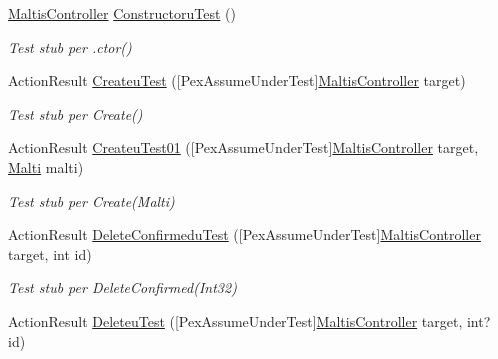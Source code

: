 \begin{DoxyCompactItemize}
\item 
\mbox{\hyperlink{class_brew_day2_1_1_controllers_1_1_maltis_controller}{Maltis\+Controller}} \mbox{\hyperlink{class_brew_day2_1_1_controllers_1_1_unit_test_1_1_maltis_controlleru_test_a98772566bedd26419c0c8193c993d287}{Constructoru\+Test}} ()
\begin{DoxyCompactList}\small\item\em Test stub per .ctor()\end{DoxyCompactList}\item 
Action\+Result \mbox{\hyperlink{class_brew_day2_1_1_controllers_1_1_unit_test_1_1_maltis_controlleru_test_a58c111dceecc7497fb50b430b64a08f0}{Createu\+Test}} (\mbox{[}Pex\+Assume\+Under\+Test\mbox{]}\mbox{\hyperlink{class_brew_day2_1_1_controllers_1_1_maltis_controller}{Maltis\+Controller}} target)
\begin{DoxyCompactList}\small\item\em Test stub per Create()\end{DoxyCompactList}\item 
Action\+Result \mbox{\hyperlink{class_brew_day2_1_1_controllers_1_1_unit_test_1_1_maltis_controlleru_test_a229ca42a99c42c426cfd3e201e561356}{Createu\+Test01}} (\mbox{[}Pex\+Assume\+Under\+Test\mbox{]}\mbox{\hyperlink{class_brew_day2_1_1_controllers_1_1_maltis_controller}{Maltis\+Controller}} target, \mbox{\hyperlink{class_brew_day2_1_1_models_1_1_malti}{Malti}} malti)
\begin{DoxyCompactList}\small\item\em Test stub per Create(\+Malti)\end{DoxyCompactList}\item 
Action\+Result \mbox{\hyperlink{class_brew_day2_1_1_controllers_1_1_unit_test_1_1_maltis_controlleru_test_af37fbef2d7458e4d9208dc33d5468a07}{Delete\+Confirmedu\+Test}} (\mbox{[}Pex\+Assume\+Under\+Test\mbox{]}\mbox{\hyperlink{class_brew_day2_1_1_controllers_1_1_maltis_controller}{Maltis\+Controller}} target, int id)
\begin{DoxyCompactList}\small\item\em Test stub per Delete\+Confirmed(\+Int32)\end{DoxyCompactList}\item 
Action\+Result \mbox{\hyperlink{class_brew_day2_1_1_controllers_1_1_unit_test_1_1_maltis_controlleru_test_a33977a78d8258038e602ae4eadbe6b05}{Deleteu\+Test}} (\mbox{[}Pex\+Assume\+Under\+Test\mbox{]}\mbox{\hyperlink{class_brew_day2_1_1_controllers_1_1_maltis_controller}{Maltis\+Controller}} target, int? id)

\end{DoxyCompactItemize}
